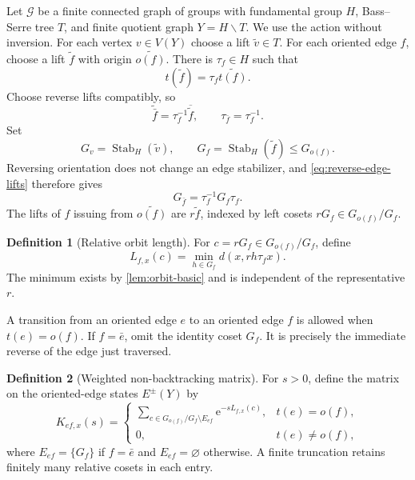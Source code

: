 \documentclass[11pt]{article}
\theoremstyle{definition}
\newtheorem{definition}[definition]{Definition}
\newcommand{\e}{\mathrm e}
\begin{document}
Let $\mathcal G$ be a finite connected graph of groups with fundamental group $H$, Bass--Serre
tree $T$, and finite quotient graph $Y=H\backslash T$.  We use the action without inversion.
For each vertex $v\in V(Y)$ choose a lift $\widetilde v\in T$.  For each oriented edge $f$,
choose a lift $\widetilde f$ with origin $\widetilde{o(f)}$.  There is $\tau_f\in H$ such that
\[
 t(\widetilde f)=\tau_f\widetilde{t(f)}.
\]
Choose reverse lifts compatibly, so
\begin{equation}\label{eq:reverse-edge-lifts}
 \widetilde{\bar f}=\tau_f^{-1}\overline{\widetilde f},
 \qquad
 \tau_{\bar f}=\tau_f^{-1}.
\end{equation}
Set
\[
 G_v=\operatorname{Stab}_H(\widetilde v),
 \qquad
 G_f=\operatorname{Stab}_H(\widetilde f)\le G_{o(f)}.
\]
Reversing orientation does not change an edge stabilizer, and
\eqref{eq:reverse-edge-lifts} therefore gives
\begin{equation}\label{eq:reverse-edge-stabilizer}
 G_{\bar f}=\tau_f^{-1}G_f\tau_f.
\end{equation}
The lifts of $f$ issuing from $\widetilde{o(f)}$ are $r\widetilde f$, indexed by left cosets
$rG_f\in G_{o(f)}/G_f$.

\begin{definition}[Relative orbit length]
\label{def:relative-length}
For $c=rG_f\in G_{o(f)}/G_f$, define
\begin{equation}\label{eq:relative-length}
 L_{f,x}(c)=\min_{h\in G_f}d(x,rh\tau_f x).
\end{equation}
The minimum exists by \cref{lem:orbit-basic} and is independent of the representative $r$.
\end{definition}

A transition from an oriented edge $e$ to an oriented edge $f$ is allowed when
$t(e)=o(f)$.  If $f=\bar e$, omit the identity coset $G_f$. It is precisely the immediate
reverse of the edge just traversed.

\begin{definition}[Weighted non-backtracking matrix]
\label{def:relative-matrix}
For $s>0$, define the matrix on the oriented-edge states $E^{\pm}(Y)$ by
\begin{equation}\label{eq:relative-matrix}
 K_{ef,x}(s)=
 \begin{cases}
 \displaystyle
 \sum_{c\in G_{o(f)}/G_f\setminus E_{ef}}
 \e^{-sL_{f,x}(c)},&t(e)=o(f),\\[1.2ex]
 0,&t(e)\ne o(f),
 \end{cases}
\end{equation}
where $E_{ef}=\{G_f\}$ if $f=\bar e$ and $E_{ef}=\varnothing$ otherwise.  A finite truncation
retains finitely many relative cosets in each entry.
\end{definition}
\end{document}
